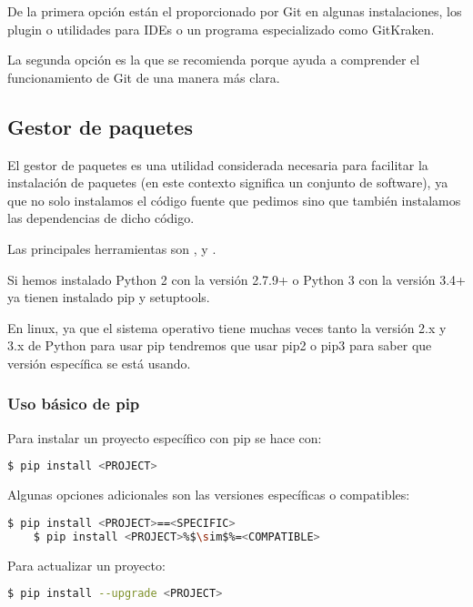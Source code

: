 De la primera opción están el proporcionado por Git en algunas instalaciones, los plugin o utilidades para IDEs o un programa especializado como GitKraken.

La segunda opción es la que se recomienda porque ayuda a comprender el funcionamiento de Git de una manera más clara.


\subsection{Gestor de paquetes}

El gestor de paquetes es una utilidad considerada necesaria para facilitar la instalación de paquetes (en este contexto significa un conjunto de software), ya que no solo instalamos el código fuente que pedimos sino que también instalamos las dependencias de dicho código.

Las principales herramientas son ,  y .

Si hemos instalado Python 2 con la versión 2.7.9+ o Python 3 con la versión 3.4+ ya tienen instalado pip y setuptools.

En linux, ya que el sistema operativo tiene muchas veces tanto la versión 2.x y 3.x de Python para usar pip tendremos que usar pip2 o pip3 para saber que versión específica se está usando.

\subsubsection{Uso básico de pip}

Para instalar un proyecto específico con pip \cite{pip} se hace con:

\begin{lstlisting}[language=bash]
    $ pip install <PROJECT>
\end{lstlisting}

Algunas opciones adicionales son las versiones específicas o compatibles:

\begin{lstlisting}[language=bash, escapechar=\%]
    $ pip install <PROJECT>==<SPECIFIC>
    $ pip install <PROJECT>%$\sim$%=<COMPATIBLE>
\end{lstlisting}

Para actualizar un proyecto:

\begin{lstlisting}[language=bash]
    $ pip install --upgrade <PROJECT>
\end{lstlisting}

